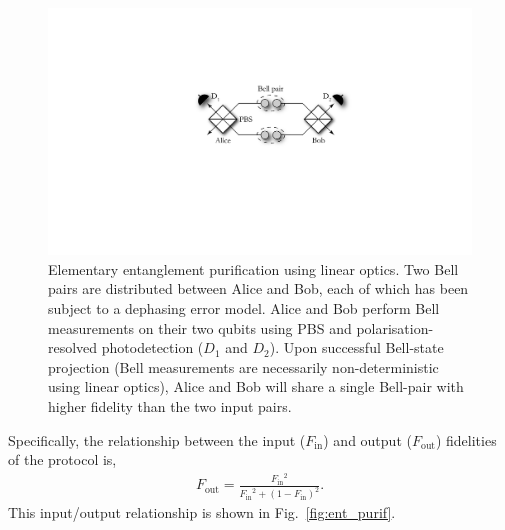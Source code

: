 \documentclass[aps,rmp,twocolumn,amsmath,amssymb,nofootinbib,superscriptaddress]{revtex4}
\begin{document}
\begin{figure}[!htb]
\includegraphics[width=0.9\columnwidth]{ent_purif_prot}
\caption{Elementary entanglement purification using linear optics. Two Bell pairs are distributed between Alice and Bob, each of which has been subject to a dephasing error model. Alice and Bob perform Bell measurements on their two qubits using PBS and polarisation-resolved photodetection ($D_1$ and $D_2$). Upon successful Bell-state projection (Bell measurements are necessarily non-deterministic using linear optics), Alice and Bob will share a single Bell-pair with higher fidelity than the two input pairs.} \label{fig:ent_purif_prot}
\end{figure}

Specifically, the relationship between the input ($F_\mathrm{in}$) and output ($F_\mathrm{out}$) fidelities of the protocol is,
\begin{align}
F_\mathrm{out} = \frac{{F_\mathrm{in}}^2}{{F_\mathrm{in}}^2 + (1-F_\mathrm{in})^2}.
\end{align}
This input/output relationship is shown in Fig.~\ref{fig:ent_purif}.
\end{document}
